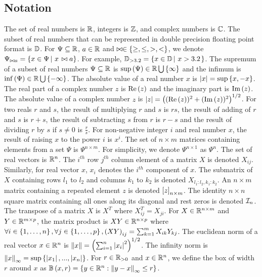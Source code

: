 \subsection{Notation}
The set of real numbers is $\mathbb{R}$, integers is $\mathbb{Z}$, and
complex numbers is $\mathbb{C}$.  The subset of real numbers that can be
represented in double precision floating point format is $\mathbb{D}$.
For $\Psi\subseteq\mathbb{R}$, $a\in\mathbb{R}$ and
$\bowtie\in\left\{\geq,\leq,>,<\right\}$, we denote $\Psi_{\bowtie a} = \left\{
  x\in\Psi \left|~x\right. \bowtie a \right\}$.  For example, $\mathbb{D}_{>3.2} =
\left\{x\in\mathbb{D}\left|~x>3.2\right.\right\}$.  The supremum of a subset of real numbers
$\Psi\subseteq\mathbb{R}$ is $\sup\left(\Psi\right)\in\mathbb{R}\bigcup\left\{\infty\right\}$
and the infimum is $\inf\left(\Psi\right)\in\mathbb{R}\bigcup\left\{-\infty\right\}$.  The
absolute value of a real number $x$ is $\left|x\right| = \sup\left\{x,-x\right\}$.
The real part of a complex number $z$ is $\operatorname{Re}\left(z\right)$ and the imaginary
part is $\operatorname{Im}\left(z\right)$.  The absolute value of a complex number $z$ is
$\left|z\right| = \left((\operatorname{Re}\left(z\right))^2 + (\operatorname{Im}\left(z\right))^2\right)^{1/2}$.  For two reals $r$
and $s$, the result of multiplying $r$ and $s$ is $rs$, the result of
adding of $r$ and $s$ is $r+s$, the result of subtracting $s$ from $r$
is $r-s$ and the result of dividing $r$ by $s$ if $s\neq 0$ is
$\frac{r}{s}$.  For non-negative integer $i$ and real number $x$, the
result of raising $x$ to the power $i$ is $x^i$.  The set of $n\times
m$ matrices containing elements from a set $\Psi$ is $\Psi^{n\times
  m}$.  For simplicity, we denote $\Psi^{n\times 1}$ as $\Psi^n$.  The
set of real vectors is $\mathbb{R}^n$.  The $i^{th}$ row $j^{th}$ column
element of a matrix $X$ is denoted $X_{ij}$.  Similarly, for real
vector $x$, $x_i$ denotes the $i^{th}$ component of $x$.  The
submatrix of $X$ containing rows $l_1$ to $l_2$ and columns $k_1$ to
$k_2$ is denoted $X_{l_1:l_2,k_1:k_2}$.  An $n\times m$ matrix
containing a repeated element $z$ is denoted $\left[z\right]_{n\times m}$.
The identity $n\times n$ square matrix containing all ones along its
diagonal and rest zeros is denoted $\mathcal{I}_{n}$.  The transpose of a
matrix $X$ is $X^T$ where $X^T_{ij} = X_{ji}$.  For
$X\in\mathbb{R}^{n\times m}$ and $Y\in\mathbb{R}^{m\times p}$, the matrix
product is $XY\in\mathbb{R}^{n\times p}$ where $\forall
i\in\left\{1,\ldots,n\right\},\forall j\in\left\{1,\ldots,p\right\},\left(XY\right)_{ij} =
\sum_{k=1}^{m}X_{ik}Y_{kj}$.  The euclidean norm of a real vector
$x\in\mathbb{R}^n$ is $\left\|x\right\| = \left(\sum_{i=1}^n\left|x_i\right|^2\right)^{1/2}$.
The infinity norm is $\left\|x\right\|_\infty =
\sup\left\{\left|x_1\right|,...,\left|x_n\right|\right\}$.  For $r\in\mathbb{R}_{> 0}$ and
$x\in\mathbb{R}^n$, we define the box of width $r$ around $x$ as
$\mathbb{B}\left(x,r\right) = \left\{ y\in\mathbb{R}^n: \left\|y - x\right\|_\infty \leq r \right\}$.

